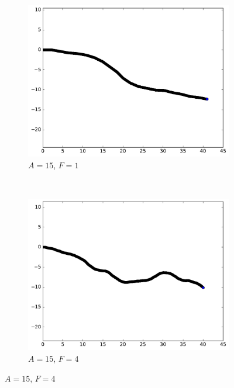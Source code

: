     \newcommand{\subImgWarea}{0.42\textwidth}
	\newcommand{\subImgWmo}{0.32\textwidth}
	\begin{figure}[htb]
		\begin{subfigure}[t]{\subImgWmo}
			\centering
			\includegraphics[width=\textwidth]{figures/ch3/synTraj_219_15_1}
			\caption[$A = 15$, $F=1$]{$A = 15$, $F=1$}
			\label{fig:synTraj_219_15_1}
		\end{subfigure}
		~
		\begin{subfigure}[t]{\subImgWmo}
			\centering
			\includegraphics[width=\textwidth]{figures/ch3/synTraj_219_15_4}
			\caption[$A = 15$, $F=4$]{$A = 15$, $F=4$}
			\label{fig:synTraj_219_15_4}
		\end{subfigure}

\end{figure}
